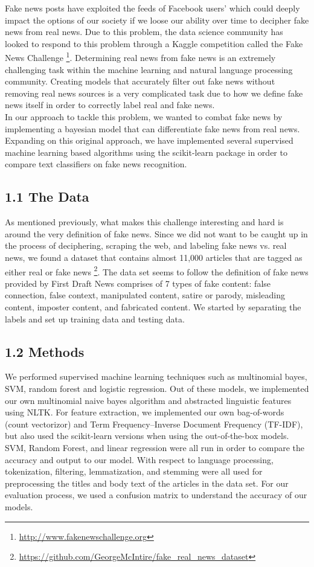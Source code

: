 \documentclass{neu_handout}
\begin{document}
Fake news posts have exploited the feeds of Facebook users' which could deeply impact the options of our society if we loose our ability over time to decipher fake news from real news. Due to this problem, the data science community has looked to respond to this problem through a Kaggle competition called the Fake News Challenge \footnote{\url{http://www.fakenewschallenge.org}}. Determining real news from fake news is an extremely challenging task within the machine learning and natural language processing community. Creating models that accurately filter out fake news without removing real news sources is a very complicated task due to how we define fake news itself in order to correctly label real and fake news.\\

In our approach to tackle this problem, we wanted to combat fake news by implementing a bayesian model that can differentiate fake news from real news. Expanding on this original approach, we have implemented several supervised machine learning based algorithms using the scikit-learn package in order to compare text classifiers on fake news recognition. 


\subsection*{1.1 The Data}
As mentioned previously, what makes this challenge interesting and hard is around the very definition of fake news. Since we did not want to be caught up in the process of deciphering, scraping the web, and labeling fake news vs. real news, we found a dataset that contains almost 11,000 articles that are tagged as either real or fake news \footnote{\url{https://github.com/GeorgeMcIntire/fake_real_news_dataset}}. The data set seems to follow the definition of fake news provided by First Draft News comprises of 7 types of fake content: false connection, false context, manipulated content, satire or parody, misleading content, imposter content, and fabricated content. We started by separating the labels and set up training data and testing data.


\subsection*{1.2 Methods}
We performed supervised machine learning techniques such as multinomial bayes, SVM, random forest and logistic regression. Out of these models, we implemented our own multinomial naive bayes algorithm and abstracted linguistic features using NLTK. For feature extraction, we implemented our own bag-of-words (count vectorizor) and Term Frequency–Inverse Document Frequency (TF-IDF), but also used the scikit-learn versions when using the out-of-the-box models. SVM, Random Forest, and linear regression were all run in order to compare the accuracy and output to our model. With respect to language processing, tokenization, filtering, lemmatization, and stemming were all used for preprocessing the titles and body text of the articles in the data set. For our evaluation process, we used a confusion matrix to understand the accuracy of our models.
\end{document}
